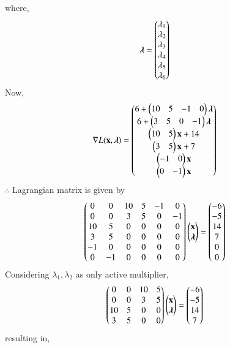 \documentclass[journal,12pt,twocolumn]{IEEEtran}
\begin{document}
where,
\begin{align}
    \boldsymbol{\lambda} &= \begin{pmatrix}\lambda_1 \\ \lambda_2 \\ \lambda_3 \\ \lambda_4 \\ \lambda_5 \\ \lambda_6\end{pmatrix}
\end{align}
Now,
\begin{align}
    \nabla L(\mathbf{x},\boldsymbol{\lambda}) &= \begin{pmatrix}6+ \begin{pmatrix}10 & 5 & -1 & 0 \end{pmatrix}\boldsymbol{\lambda}\\ 6+\begin{pmatrix}3 & 5 & 0 & -1\end{pmatrix}\boldsymbol{\lambda} \\ \begin{pmatrix}10 & 5\end{pmatrix}\mathbf{x}+14 \\ \begin{pmatrix}3 & 5\end{pmatrix}\mathbf{x}+7 \\ \begin{pmatrix}-1 & 0\end{pmatrix}\mathbf{x} \\ \begin{pmatrix}0 & -1\end{pmatrix}\mathbf{x}\end{pmatrix}
\end{align}
$\therefore$ Lagrangian matrix is given by
\begin{align}
    \begin{pmatrix}0 & 0 & 10 & 5 & -1 & 0 \\ 0 & 0 & 3 & 5 & 0 & -1 \\ 10 & 5 & 0 & 0 & 0 & 0  \\ 3 & 5 & 0 & 0 & 0 & 0  \\ -1 & 0 & 0 & 0 & 0 & 0  \\ 0 & -1 & 0 & 0 & 0 & 0 \end{pmatrix}\begin{pmatrix}\mathbf{x} \\ \boldsymbol{\lambda} \end{pmatrix} &= \begin{pmatrix}-6 \\ -5 \\ 14 \\ 7 \\ 0 \\0 \end{pmatrix}
\end{align}
Considering $\lambda_1,\lambda_2$ as only active multiplier,
\begin{align}
    \begin{pmatrix}0 & 0 & 10 & 5 \\ 0 & 0 & 3 & 5 \\ 10 & 5 & 0 & 0 \\ 3 & 5 & 0 & 0\end{pmatrix}\begin{pmatrix}\mathbf{x}\\ \boldsymbol{\lambda}\end{pmatrix} &=\begin{pmatrix}-6 \\ -5 \\ 14 \\ 7\end{pmatrix}
\end{align}
resulting in,
\end{document}
